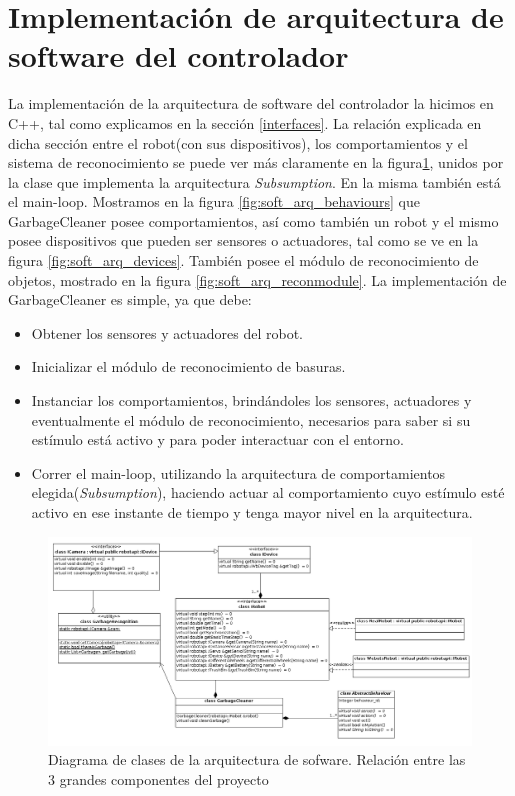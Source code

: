 
\section[Implementaci\'on de arquitectura de software del controlador]
		{Implementaci\'on de arquitectura de software del controlador}
La implementaci\'on de la arquitectura de software del controlador la hicimos en C++, tal
como explicamos en la secci\'on \ref{interfaces}. La relaci\'on explicada en dicha secci\'on
entre el robot(con sus dispositivos), los comportamientos y el sistema de reconocimiento se
puede ver m\'as claramente en la figura\ref{fig:theAllTogether}, unidos por la clase que implementa
la arquitectura \emph{Subsumption}. En la misma tambi\'en est\'a el main-loop. Mostramos en la figura
\ref{fig:soft_arq_behaviours} que GarbageCleaner posee comportamientos, as\'i como tambi\'en
un robot y el mismo posee dispositivos que pueden ser sensores o actuadores, tal como se ve
en la figura \ref{fig:soft_arq_devices}. Tambi\'en posee el m\'odulo de reconocimiento de
objetos, mostrado en la figura \ref{fig:soft_arq_reconmodule}. La implementaci\'on de GarbageCleaner
es simple, ya que debe:
\begin{itemize}
	\item{} Obtener los sensores y actuadores del robot.
	\item{} Inicializar el m\'odulo de reconocimiento de basuras.
	\item{} Instanciar los comportamientos, brind\'andoles los sensores, actuadores y eventualmente
			el m\'odulo de reconocimiento, necesarios para saber si su est\'imulo est\'a activo y
			para poder interactuar con el entorno.
	\item{} Correr el main-loop, utilizando la arquitectura de comportamientos
			elegida(\emph{Subsumption}), haciendo actuar al comportamiento cuyo est\'imulo
			est\'e activo en ese instante de tiempo y tenga mayor nivel en la arquitectura.
\end{itemize}
\begin{landscape}
\begin{figure}[h]
	\centering
	\includegraphics[scale=0.52]{comportamientos/figures/api4.png}
	\caption[Arquitectura de software: principales componentes]{Diagrama de clases de la arquitectura
			de sofware. Relaci\'on entre las 3 grandes componentes del proyecto}
	\label{fig:theAllTogether}
\end{figure}
\end{landscape}


